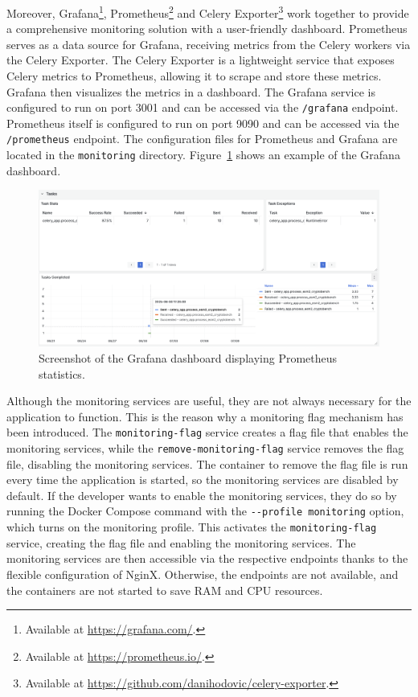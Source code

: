 Moreover, Grafana\footnote{Available at \url{https://grafana.com/}.}, Prometheus\footnote{Available at \url{https://prometheus.io/}.} and Celery Exporter\footnote{Available at \url{https://github.com/danihodovic/celery-exporter}.} work together to provide a comprehensive monitoring solution with a user-friendly dashboard. Prometheus serves as a data source for Grafana, receiving metrics from the Celery workers via the Celery Exporter. The Celery Exporter is a lightweight service that exposes Celery metrics to Prometheus, allowing it to scrape and store these metrics. Grafana then visualizes the metrics in a dashboard. The Grafana service is configured to run on port 3001 and can be accessed via the \lstinline!/grafana! endpoint. Prometheus itself is configured to run on port 9090 and can be accessed via the \lstinline!/prometheus! endpoint. The configuration files for Prometheus and Grafana are located in the \lstinline!monitoring! directory. Figure~\ref{fig:grafana} shows an example of the Grafana dashboard.

\begin{figure}[htpb]
    \centering
    \includegraphics[width=\textwidth]{img/grafana.png}
    \caption{Screenshot of the Grafana dashboard displaying Prometheus statistics.}
    \label{fig:grafana}
\end{figure}

Although the monitoring services are useful, they are not always necessary for the application to function. This is the reason why a monitoring flag mechanism has been introduced. The \lstinline!monitoring-flag! service creates a flag file that enables the monitoring services, while the \lstinline!remove-monitoring-flag! service removes the flag file, disabling the monitoring services. The container to remove the flag file is run every time the application is started, so the monitoring services are disabled by default. If the developer wants to enable the monitoring services, they do so by running the Docker Compose command with the \lstinline|--profile monitoring| option, which turns on the monitoring profile. This activates the \lstinline!monitoring-flag! service, creating the flag file and enabling the monitoring services. The monitoring services are then accessible via the respective endpoints thanks to the flexible configuration of NginX. Otherwise, the endpoints are not available, and the containers are not started to save RAM and CPU resources.

